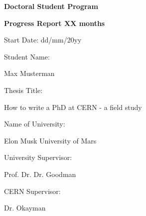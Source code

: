 \documentclass{article}
\newcommand{\StudentName}{Max Musterman}
\newcommand{\UniSupervisorName}{Prof. Dr. Dr. Goodman}
\newcommand{\CernSupervisorName}{Dr. Okayman}
\begin{document}

\begin{center}
\vspace*{3\baselineskip}

{\huge \textbf{Doctoral Student Program}}

\vspace*{3\baselineskip}

{\LARGE \textbf{Progress Report XX months}}

\begin{large}
\vspace*{2\baselineskip}

Start Date: dd/mm/20yy

\vspace*{2\baselineskip}

Student Name:

\vspace*{\baselineskip}

\StudentName

\vspace*{2\baselineskip}

Thesis Title:

\vspace*{\baselineskip}

How to write a PhD at CERN - a field study

\vspace*{5\baselineskip}

Name of University:

\vspace*{\baselineskip}

Elon Musk University of Mars

\vspace*{2\baselineskip}

University Supervisor:

\vspace*{\baselineskip}

\UniSupervisorName

\vspace*{2\baselineskip}

CERN Supervisor:

\vspace*{\baselineskip}

\CernSupervisorName

\end{large}
\end{center}
\pagebreak
\end{document}
